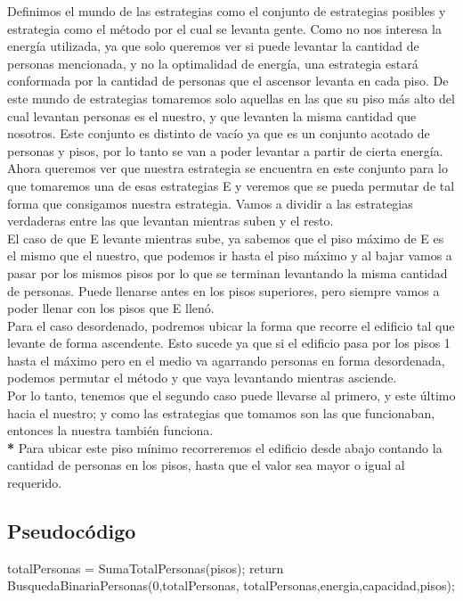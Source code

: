 Definimos el mundo de las estrategias como el conjunto de estrategias posibles y estrategia como el método por el cual se levanta gente. Como no nos interesa
la energía utilizada, ya que solo queremos ver si puede levantar la cantidad de personas mencionada, y no la optimalidad de energía, una estrategia estará conformada por la cantidad
de personas que el ascensor levanta en cada piso. De este mundo de estrategias tomaremos solo aquellas en las que su piso más alto del cual levantan personas es el nuestro, y que
levanten la misma cantidad que nosotros. Este conjunto es distinto de vacío ya que es un conjunto acotado de personas y pisos, por lo tanto se van a poder levantar a partir de
cierta energía. Ahora queremos ver que nuestra estrategia se encuentra en este conjunto  para lo que tomaremos una de esas estrategias E y veremos que se pueda permutar de tal
forma que consigamos nuestra estrategia. Vamos a dividir a las estrategias verdaderas entre las que levantan mientras suben y el resto.\\
El caso de que E levante mientras sube, ya sabemos que el piso máximo de E es el mismo que 
el nuestro, que podemos ir hasta el piso máximo y al bajar vamos a pasar por los mismos pisos por lo que se terminan levantando la misma cantidad de personas. Puede llenarse antes en los pisos superiores, pero siempre vamos a poder
llenar con los pisos que E llenó.\\
Para el caso desordenado, podremos ubicar la forma que recorre el edificio tal que levante de forma ascendente. Esto sucede ya que si el edificio pasa por los pisos 1 hasta el máximo pero en el medio va agarrando personas en forma desordenada, podemos permutar el método y que vaya levantando mientras asciende. \\
Por lo tanto, tenemos que el segundo caso puede llevarse al primero, y este último hacia el nuestro; y como las estrategias que tomamos son las que funcionaban, entonces la nuestra también funciona.\\

{\footnotesize {\textbf{*} Para ubicar este piso mínimo recorreremos el edificio desde abajo contando la cantidad de personas en los pisos, hasta que el valor sea mayor o igual al requerido.}}

\subsection{Pseudoc\'odigo}
\begin{codebox}
\li		totalPersonas = SumaTotalPersonas(pisos);
\li		return BusquedaBinariaPersonas(0,totalPersonas, totalPersonas,energia,capacidad,pisos);
\end{codebox}

